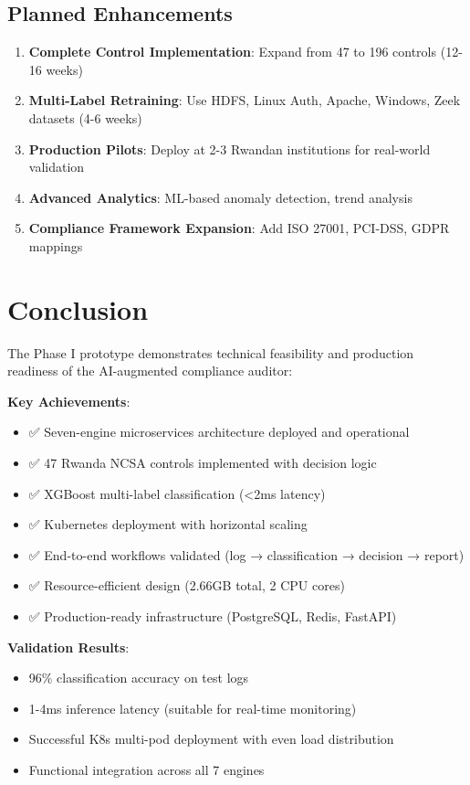 \documentclass[11pt,conference]{IEEEtran}
\begin{document}
\subsection{Planned Enhancements}

\begin{enumerate}
    \item \textbf{Complete Control Implementation}: Expand from 47 to 196 controls (12-16 weeks)
    \item \textbf{Multi-Label Retraining}: Use HDFS, Linux Auth, Apache, Windows, Zeek datasets (4-6 weeks)
    \item \textbf{Production Pilots}: Deploy at 2-3 Rwandan institutions for real-world validation
    \item \textbf{Advanced Analytics}: ML-based anomaly detection, trend analysis
    \item \textbf{Compliance Framework Expansion}: Add ISO 27001, PCI-DSS, GDPR mappings
\end{enumerate}

\section{Conclusion}

The Phase I prototype demonstrates technical feasibility and production readiness of the AI-augmented compliance auditor:

\textbf{Key Achievements}:
\begin{itemize}
    \item ✅ Seven-engine microservices architecture deployed and operational
    \item ✅ 47 Rwanda NCSA controls implemented with decision logic
    \item ✅ XGBoost multi-label classification (<2ms latency)
    \item ✅ Kubernetes deployment with horizontal scaling
    \item ✅ End-to-end workflows validated (log → classification → decision → report)
    \item ✅ Resource-efficient design (2.66GB total, 2 CPU cores)
    \item ✅ Production-ready infrastructure (PostgreSQL, Redis, FastAPI)
\end{itemize}

\textbf{Validation Results}:
\begin{itemize}
    \item 96\% classification accuracy on test logs
    \item 1-4ms inference latency (suitable for real-time monitoring)
    \item Successful K8s multi-pod deployment with even load distribution
    \item Functional integration across all 7 engines
\end{itemize}
\end{document}
